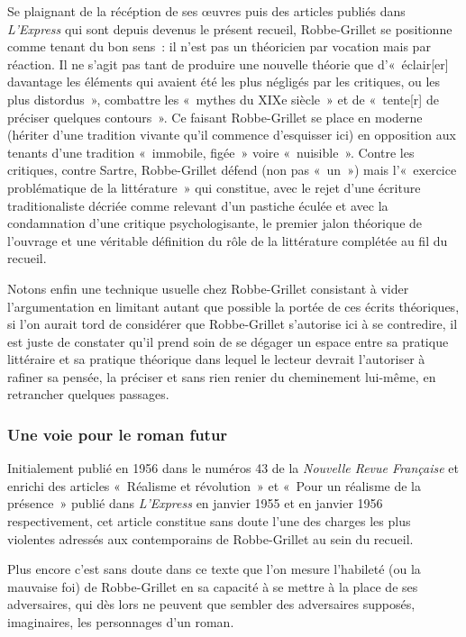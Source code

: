 \documentclass[12pt, a4paper]{article}
\begin{document}
Se plaignant de la récéption de ses œuvres puis des articles publiés dans \textit{L'Express} qui sont depuis devenus le présent recueil, Robbe-Grillet se positionne comme tenant du bon sens~: il n'est pas un théoricien par vocation mais par réaction. Il ne s'agit pas tant de produire une nouvelle théorie que d'«~éclair[er] davantage les éléments qui avaient été les plus négligés par les critiques, ou les plus distordus~», combattre les «~mythes du XIXe siècle~» et de «~tente[r] de préciser quelques contours~». Ce faisant Robbe-Grillet se place en moderne (hériter d'une tradition vivante qu'il commence d'esquisser ici) en opposition aux tenants d'une tradition «~immobile, figée~» voire «~nuisible~». Contre les critiques, contre Sartre, Robbe-Grillet défend (non pas «~un~») mais l'«~exercice problématique de la littérature~» qui constitue, avec le rejet d'une écriture traditionaliste décriée comme relevant d'un pastiche éculée et avec la condamnation d'une critique psychologisante, le premier jalon théorique de l'ouvrage et une véritable définition du rôle de la littérature complétée au fil du recueil.

Notons enfin une technique usuelle chez Robbe-Grillet consistant à vider l'argumentation en limitant autant que possible la portée de ces écrits théoriques, si l'on aurait tord de considérer que Robbe-Grillet s'autorise ici à se contredire, il est juste de constater qu'il prend soin de se dégager un espace entre sa pratique littéraire et sa pratique théorique dans lequel le lecteur devrait l'autoriser à rafiner sa pensée, la préciser et sans rien renier du cheminement lui-même, en retrancher quelques passages.


\subsubsection{Une voie pour le roman futur}
			Initialement publié en 1956 dans le numéros 43 de la\textit{ Nouvelle Revue Française} et enrichi des articles «~Réalisme et révolution~» et «~Pour un réalisme de la présence~» publié dans \textit{L'Express} en janvier 1955 et en janvier 1956 respectivement, cet article constitue sans doute l'une des charges les plus violentes adressés aux contemporains de Robbe-Grillet au sein du recueil.

Plus encore c'est sans doute dans ce texte que l'on mesure l'habileté (ou la mauvaise foi) de Robbe-Grillet en sa capacité à se mettre à la place de ses adversaires, qui dès lors ne peuvent que sembler des adversaires supposés, imaginaires, les personnages d'un roman.
\end{document}
